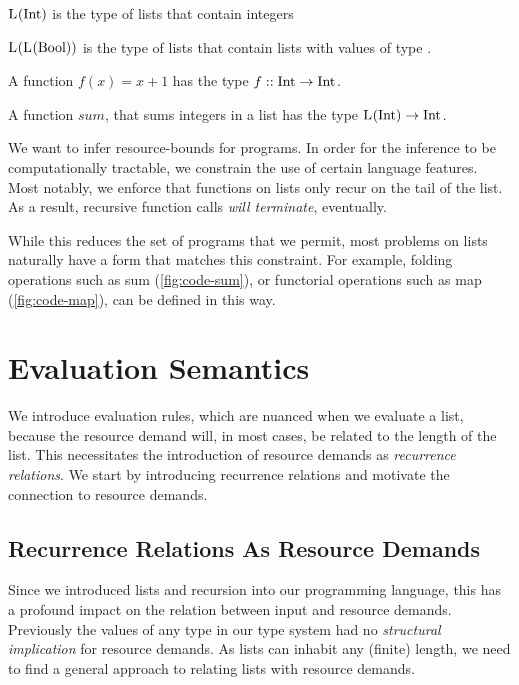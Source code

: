 \begin{example}
   \(\text{L}^{}(\text{Int})\) is the type of lists that contain integers
\end{example}

\begin{example}
   \(\text{L}^{}(\text{L}^{}(\text{Bool}))\) is the type of lists that contain lists with values of type \bool.
\end{example}

\begin{example}
   A function \(f(x) = x+1\) has the type \(f :: \text{Int} \to \text{Int} ^{}_{}\).
\end{example}

\begin{example}
   A function \(sum\), that sums integers in a list has the type \(\text{L}^{}(\text{Int}) \to \text{Int} ^{}_{}\).
\end{example}

We want to infer resource-bounds for programs. In order for the inference to be computationally tractable, we constrain the use of certain language features. Most notably, we enforce that functions on lists only recur on the tail of the list. As a result, recursive function calls \emph{will terminate}, eventually.

While this reduces the set of programs that we permit, most problems on lists naturally have a form that matches this constraint. For example, folding operations such as sum (\cref{fig:code-sum}), or functorial operations such as map (\cref{fig:code-map}), can be defined in this way. 


\section{Evaluation Semantics}

We introduce evaluation rules, which are nuanced when we evaluate a list, because the resource demand will, in most cases, be related to the length of the list. This necessitates the introduction of resource demands as \emph{recurrence relations}. We start by introducing recurrence relations and motivate the connection to resource demands. 

\subsection{Recurrence Relations As Resource Demands}

Since we introduced lists and recursion into our programming language, this has a profound impact on the relation between input and resource demands. Previously the values of any type in our type system had no \emph{structural implication} for resource demands. As lists can inhabit any (finite) length, we need to find a general approach to relating lists with resource demands. 

